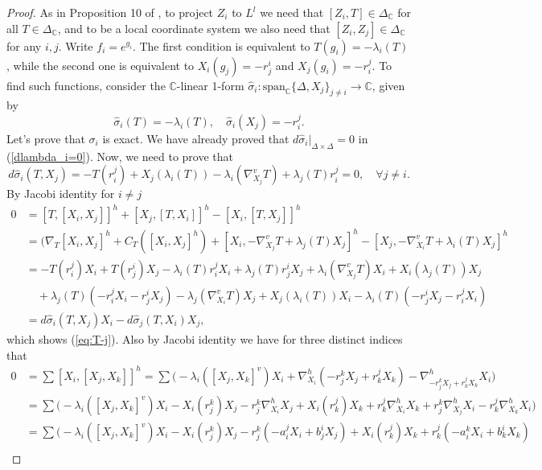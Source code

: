 \documentclass{article}
\theoremstyle{remark}
\begin{document}
\begin{proof}
    As in Proposition 10 of \cite{DFT}, to project $Z_i$ to $L^l$ we need that $[Z_i,T]\in\Delta_\mathbb{C}$ for all $T\in\Delta_\mathbb{C}$, and to be a local coordinate system we also need that $[Z_i,Z_j]\in\Delta_\mathbb{C}$ for any $i,j$. 
    Write $f_i=e^{g_i}$. The first condition is equivalent to $T(g_i)=-\lambda_i(T)$, while the second one is equivalent to $X_i(g_j)=-r^i_j$ and $X_j(g_i)=-r^j_i$. To find such functions, consider the $\mathbb{C}$-linear 1-form $\hat{\sigma}_i:\text{span}_\mathbb{C}\{\Delta,X_j\}_{j\neq i}\rightarrow \mathbb{C}$, given by
    $$\hat{\sigma}_i(T)=-\lambda_i(T),\quad \hat{\sigma}_i(X_j)=-r^j_i.$$
    Let's prove that $\sigma_i$ is exact. We have already proved that $d\hat{\sigma}_i|_{\Delta\times\Delta}=0$ in (\ref{dlambda_i=0}). Now, we need to prove that
    \begin{equation}\label{eq:T-j}
        d\hat{\sigma}_i(T,X_j)=-T(r^j_i)+X_j(\lambda_i(T))-\lambda_i(\nabla^v_{X_j}T)+\lambda_j(T)r^j_i=0,\quad\forall j\neq i.
    \end{equation}
    By Jacobi identity for $i\neq j$
    \begin{align*}
        0&=[T,[X_i,X_j]]^h+[X_j,[T,X_i]]^h-[X_i,[T,X_j]]^h\\
        &=(\nabla_T[X_i,X_j]^h+C_T([X_i,X_j]^h)+[X_i,-\nabla_{X_j}^vT+\lambda_j(T)X_j]^h-[X_j,-\nabla_{X_i}^vT+\lambda_i(T)X_j]^h\\
        &=-T(r_i^j)X_i+T(r_j^i)X_j-\lambda_i(T)r_i^jX_i+\lambda_j(T)r_j^iX_j+\lambda_i(\nabla^v_{X_j}T)X_i+X_i(\lambda_j(T))X_j\\
        &\quad+\lambda_j(T)(-r_i^jX_i-r_j^iX_j)-\lambda_j(\nabla^v_{X_i}T)X_j+X_j(\lambda_i(T))X_i-\lambda_i(T)(-r_j^iX_j-r_i^jX_i)\\
        &=d\hat{\sigma}_i(T,X_j)X_i-d\hat{\sigma}_j(T,X_i)X_j,
    \end{align*}
    which shows (\ref{eq:T-j}). Also by Jacobi identity we have for three distinct indices that 
    \begin{align*}
        0&=\sum[X_i,[X_j,X_k]]^{h}=\sum \Big(-\lambda_i([X_j,X_k]^v)X_i+\nabla^h_{X_i}(-r^k_jX_j+r^j_kX_k)-\nabla^h_{-r^k_jX_j+r^j_kX_k}X_i\Big)\\
        &=\sum \Big(-\lambda_i([X_j,X_k]^v)X_i-X_i(r^k_j)X_j-r^k_j\nabla^h_{X_i}X_j+X_i(r^j_k)X_k+r^j_k\nabla^h_{X_i}X_k+r^k_j\nabla^h_{X_j}X_i-r^j_k\nabla^h_{X_k}X_i\Big)\\
        &=\sum\Big(-\lambda_i([X_j,X_k]^v)X_i-X_i(r^k_j)X_j-r^k_j(-a^j_iX_i+b^i_jX_j)+X_i(r^j_k)X_k+r^j_k(-a^k_iX_i+b^i_kX_k)\\

\end{align*}
\end{proof}
\end{document}
